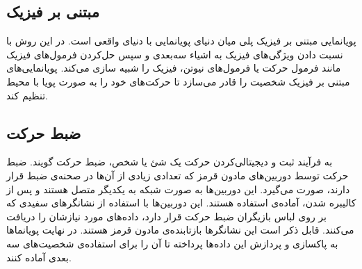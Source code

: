 \subsection{مبتنی بر فیزیک}

پویانمایی مبتنی بر فیزیک پلی میان دنیای پویانمایی با 
دنیای واقعی است. در این روش با نسبت دادن ویژگی‌های فیزیک به اشیاء سه‌بعدی و سپس حل‌کردن
فرمول‌های فیزیک مانند فرمول حرکت یا فرمول‌های نیوتن،
فیزیک را شبیه سازی می‌کند.
پویانمایی‌های مبتنی بر فیزیک شخصیت را قادر می‌سازد تا حرکت‌های خود را 
به صورت پویا با محیط تنظیم کند.

\subsection{ضبط حرکت
\protect {}}

به فرآیند ثبت و دیجیتالی‌کردن حرکت یک شئ یا شخص، ضبط حرکت گویند.
ضبط حرکت توسط دوربین‌های مادون قرمز که تعدادی زیادی از آن‌ها در صحنه‌ی ضبط قرار دارند، صورت می‌گیرد.
این دوربین‌ها به صورت شبکه به یکدیگر متصل هستند و پس از کالیبره شدن، آماده‌ی استفاده هستند.
این دوربین‌ها با استفاده از نشانگر‌های سفیدی که بر روی لباس بازیگران 
ضبط حرکت قرار دارد، داده‌های مورد نیازشان را دریافت می‌کنند.
قابل ذکر است این نشانگر‌ها بازتابنده‌ی مادون قرمز هستند.
در نهایت پویانماها به پاکسازی و پردازش این داده‌ها پرداخته تا آن را 
برای استفاده‌ی شخصیت‌های سه بعدی آماده کنند.




